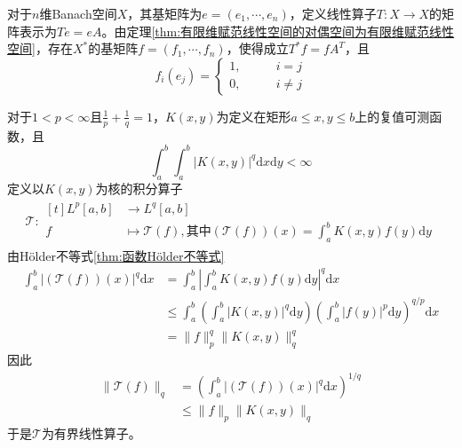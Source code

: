 \documentclass[lang = cn, scheme = chinese, thmcnt = section]{elegantbook}
\begin{document}
\begin{example}
	对于$n$维Banach空间$X$，其基矩阵为$e=(e_1,\cdots,e_n)$，定义线性算子$T:X\to X$的矩阵表示为$Te=eA$。由定理\ref{thm:有限维赋范线性空间的对偶空间为有限维赋范线性空间}，存在$X^*$的基矩阵$f=(f_1,\cdots,f_n)$，使得成立$T^*f=fA^T$，且
	$$
	f_i(e_j)=\begin{cases}
		1,\qquad & i=j\\
		0,\qquad & i\ne j
	\end{cases}
	$$
\end{example}

\begin{example}\label{例题1}
	对于$1<p<\infty$且$\frac{1}{p}+\frac{1}{q}=1$，$K(x,y)$为定义在矩形$a\le x,y\le b$上的复值可测函数，且
	$$
	\int_{a}^{b}\int_{a}^{b}|K(x,y)|^q\mathrm{d}x\mathrm{d}y<\infty
	$$
	定义以$K(x,y)$为核的积分算子
	\begin{align*}
		\mathscr{T}:\begin{aligned}[t]
			L^p[a,b]&\longrightarrow L^q[a,b]\\
			f&\longmapsto \mathscr{T}(f),\text{其中}(\mathscr{T}(f))(x)=\int_a^bK(x,y)f(y)\mathrm{d}y
		\end{aligned}
	\end{align*}
	由Hölder不等式\ref{thm:函数Hölder不等式}
	\begin{align*}
		\int_a^b |(\mathscr{T}(f))(x)|^q\mathrm{d}x
		& = \int_a^b \left|\int_a^bK(x,y)f(y)\mathrm{d}y\right|^q\mathrm{d}x\\
		& \le \int_a^b \left(\int_a^b|K(x,y)|^q\mathrm{d}y\right)\left(\int_a^b|f(y)|^p\mathrm{d}y\right)^{q/p}\mathrm{d}x\\
		& = \|f\|_p^q\|K(x,y)\|_q^q
	\end{align*}
	因此
	\begin{align*}
		\|\mathscr{T}(f)\|_q
		& = \left(\int_a^b |(\mathscr{T}(f))(x)|^q\mathrm{d}x\right)^{1/q}\\
		& \le \|f\|_p\|K(x,y)\|_q
	\end{align*}
	于是$\mathscr{T}$为有界线性算子。
	

\end{example}
\end{document}
